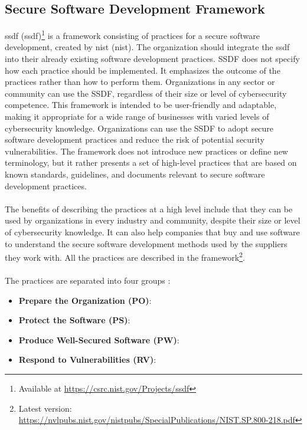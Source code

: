 \subsection{Secure Software Development Framework}
\label{ssdf}
\acrlong{ssdf} (\acrshort{ssdf})\footnote{Available at \url{https://csrc.nist.gov/Projects/ssdf}} is a framework consisting of practices for a secure software development, created by \acrlong{nist} (\acrshort{nist}). The organization should integrate the \acrshort{ssdf} into their already existing software development practices. SSDF does not specify how each practice should be implemented. It emphasizes the outcome of the practices rather than how to perform them. Organizations in any sector or community can use the SSDF, regardless of their size or level of cybersecurity competence. This framework is intended to be user-friendly and adaptable, making it appropriate for a wide range of businesses with varied levels of cybersecurity knowledge. Organizations can use the SSDF to adopt secure software development practices and reduce the risk of potential security vulnerabilities. The framework does not introduce new practices or define new terminology, but it rather presents a set of high-level practices that are based on known standards, guidelines, and documents relevant to secure software development practices. 
\\~\\
The benefits of describing the practices at a high level include that they can be used by organizations in every industry and community, despite their size or level of cybersecurity knowledge. It can also help companies that buy and use software to understand the secure software development methods used by the suppliers they work with. All the practices are described in the framework\footnote{Latest version: \url{https://nvlpubs.nist.gov/nistpubs/SpecialPublications/NIST.SP.800-218.pdf}}.
\\~\\
The practices are separated into four groups \cite{ssdf}:
\begin{itemize}
  \item \textbf{Prepare the Organization (PO)}: \textit{}
  \item \textbf{Protect the Software (PS)}: \textit{}
  \item \textbf{Produce Well-Secured Software (PW)}: 
  \item \textbf{Respond to Vulnerabilities (RV)}: \textit{}
\end{itemize}

